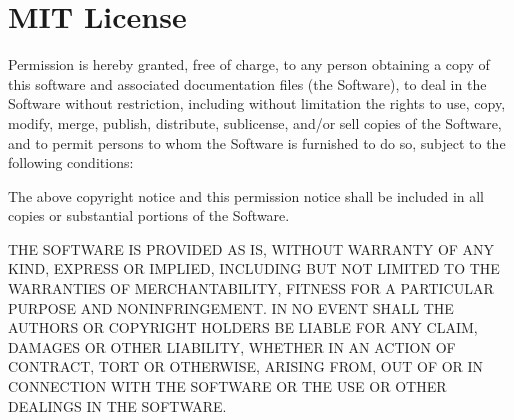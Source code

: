 \chapter{MIT License }
\hypertarget{md_frontend_2node__modules_2ts-api-utils_2LICENSE}{}\label{md_frontend_2node__modules_2ts-api-utils_2LICENSE}
\label{md_frontend_2node__modules_2ts-api-utils_2LICENSE_autotoc_md4647}%
%


Permission is hereby granted, free of charge, to any person obtaining a copy of this software and associated documentation files (the \textquotesingle{}Software\textquotesingle{}), to deal in the Software without restriction, including without limitation the rights to use, copy, modify, merge, publish, distribute, sublicense, and/\+or sell copies of the Software, and to permit persons to whom the Software is furnished to do so, subject to the following conditions:\+

The above copyright notice and this permission notice shall be included in all copies or substantial portions of the Software.

THE SOFTWARE IS PROVIDED \textquotesingle{}AS IS\textquotesingle{}, WITHOUT WARRANTY OF ANY KIND, EXPRESS OR IMPLIED, INCLUDING BUT NOT LIMITED TO THE WARRANTIES OF MERCHANTABILITY, FITNESS FOR A PARTICULAR PURPOSE AND NONINFRINGEMENT. IN NO EVENT SHALL THE AUTHORS OR COPYRIGHT HOLDERS BE LIABLE FOR ANY CLAIM, DAMAGES OR OTHER LIABILITY, WHETHER IN AN ACTION OF CONTRACT, TORT OR OTHERWISE, ARISING FROM, OUT OF OR IN CONNECTION WITH THE SOFTWARE OR THE USE OR OTHER DEALINGS IN THE SOFTWARE. 
